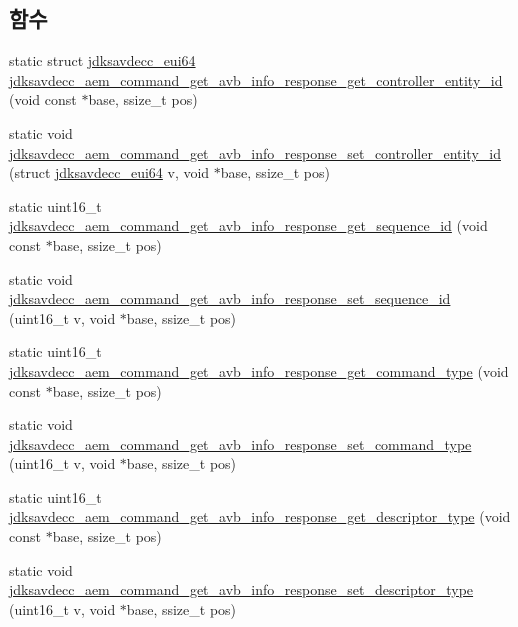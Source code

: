 \subsection*{함수}
\begin{DoxyCompactItemize}
\item 
static struct \hyperlink{structjdksavdecc__eui64}{jdksavdecc\+\_\+eui64} \hyperlink{group__command__get__avb__info__response_ga4aeaaab55be05eed218c88328112e173}{jdksavdecc\+\_\+aem\+\_\+command\+\_\+get\+\_\+avb\+\_\+info\+\_\+response\+\_\+get\+\_\+controller\+\_\+entity\+\_\+id} (void const $\ast$base, ssize\+\_\+t pos)
\item 
static void \hyperlink{group__command__get__avb__info__response_ga604125ab402eb172e42b1dd48738b0bd}{jdksavdecc\+\_\+aem\+\_\+command\+\_\+get\+\_\+avb\+\_\+info\+\_\+response\+\_\+set\+\_\+controller\+\_\+entity\+\_\+id} (struct \hyperlink{structjdksavdecc__eui64}{jdksavdecc\+\_\+eui64} v, void $\ast$base, ssize\+\_\+t pos)
\item 
static uint16\+\_\+t \hyperlink{group__command__get__avb__info__response_ga7e4c1441a327104244aac63ae756f3d1}{jdksavdecc\+\_\+aem\+\_\+command\+\_\+get\+\_\+avb\+\_\+info\+\_\+response\+\_\+get\+\_\+sequence\+\_\+id} (void const $\ast$base, ssize\+\_\+t pos)
\item 
static void \hyperlink{group__command__get__avb__info__response_ga155698429426a237413547f3138bec93}{jdksavdecc\+\_\+aem\+\_\+command\+\_\+get\+\_\+avb\+\_\+info\+\_\+response\+\_\+set\+\_\+sequence\+\_\+id} (uint16\+\_\+t v, void $\ast$base, ssize\+\_\+t pos)
\item 
static uint16\+\_\+t \hyperlink{group__command__get__avb__info__response_gaf95c5a0c5949c99599f532f0e927ce9d}{jdksavdecc\+\_\+aem\+\_\+command\+\_\+get\+\_\+avb\+\_\+info\+\_\+response\+\_\+get\+\_\+command\+\_\+type} (void const $\ast$base, ssize\+\_\+t pos)
\item 
static void \hyperlink{group__command__get__avb__info__response_gaa010bdfd42d209acfdf97db65a90c1f4}{jdksavdecc\+\_\+aem\+\_\+command\+\_\+get\+\_\+avb\+\_\+info\+\_\+response\+\_\+set\+\_\+command\+\_\+type} (uint16\+\_\+t v, void $\ast$base, ssize\+\_\+t pos)
\item 
static uint16\+\_\+t \hyperlink{group__command__get__avb__info__response_gad2031024e97206470bccff99b206804f}{jdksavdecc\+\_\+aem\+\_\+command\+\_\+get\+\_\+avb\+\_\+info\+\_\+response\+\_\+get\+\_\+descriptor\+\_\+type} (void const $\ast$base, ssize\+\_\+t pos)
\item 
static void \hyperlink{group__command__get__avb__info__response_ga7fa52412544f9ccf7d1483d3c0ab4e6a}{jdksavdecc\+\_\+aem\+\_\+command\+\_\+get\+\_\+avb\+\_\+info\+\_\+response\+\_\+set\+\_\+descriptor\+\_\+type} (uint16\+\_\+t v, void $\ast$base, ssize\+\_\+t pos)

\end{DoxyCompactItemize}
